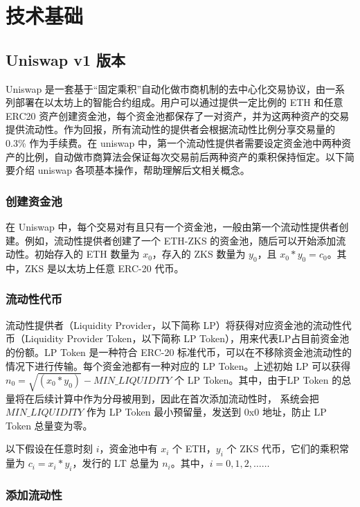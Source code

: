 \documentclass[]{template/llncs}
\begin{document}
\section{技术基础}

\subsection{Uniswap v1 版本}
Uniswap\cite{uniswapv1} 是一套基于“固定乘积”自动化做市商机制的去中心化交易协议，由一系列部署在以太坊上的智能合约组成。用户可以通过提供一定比例的 ETH 和任意 ERC20 资产创建资金池，每个资金池都保存了一对资产，并为这两种资产的交易提供流动性。作为回报，所有流动性的提供者会根据流动性比例分享交易量的 0.3\% 作为手续费。在 uniswap 中，第一个流动性提供者需要设定资金池中两种资产的比例，自动做市商算法会保证每次交易前后两种资产的乘积保持恒定。以下简要介绍 uniswap 各项基本操作，帮助理解后文相关概念。

\subsubsection{创建资金池}

在 Uniswap 中，每个交易对有且只有一个资金池，一般由第一个流动性提供者创建。例如，流动性提供者创建了一个 ETH-ZKS 的资金池，随后可以开始添加流动性。初始存入的 ETH 数量为 $x_0$，存入的 ZKS 数量为 $y_0$，且 $x_0*y_0 = c_0$。其中，ZKS 是以太坊上任意 ERC-20 代币。

\subsubsection{流动性代币}

流动性提供者（Liquidity Provider，以下简称 LP）将获得对应资金池的流动性代币（Liquidity Provider Token，以下简称 LP Token），用来代表LP占目前资金池的份额。LP Token 是一种符合 ERC-20 标准代币，可以在不移除资金池流动性的情况下进行传输。每个资金池都有一种对应的 LP Token。上述初始 LP 可以获得 $n_0 = \sqrt{(x_0*y_0)} - MIN\_LIQUIDITY$ 个 LP Token。其中，由于LP Token 的总量将在后续计算中作为分母被用到，因此在首次添加流动性时， 系统会把 $MIN\_LIQUIDITY$ 作为 LP Token 最小预留量，发送到 0x0 地址，防止 LP Token 总量变为零。

以下假设在任意时刻 $i$，资金池中有 $x_i$ 个 ETH，$y_i$ 个 ZKS 代币，它们的乘积常量为 $c_i = x_i *y_i$，发行的 LT 总量为 $n_i$。其中，$i = 0,1,2,……$

\subsubsection{添加流动性}
\end{document}

